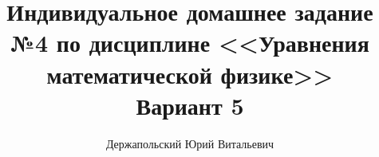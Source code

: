 \documentclass[14pt, a4paper, titlepage, fleqn]{extarticle}
\title{Индивидуальное домашнее задание №4 по дисциплине <<Уравнения математической физике>>\\Вариант 5}
\author{Держапольский Юрий Витальевич}
\date{}
\begin{document}
    \maketitle

    

    \pagebreak
    
    

    \pagebreak
    
    
    
\end{document}
